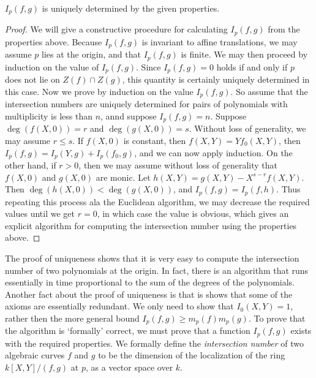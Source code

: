 \begin{theorem}
    $I_p(f,g)$ is uniquely determined by the given properties.
\end{theorem}
\begin{proof}
    We will give a constructive procedure for calculating $I_p(f,g)$ from the properties above. Because $I_p(f,g)$ is invariant to affine translations, we may assume $p$ lies at the origin, and that $I_p(f,g)$ is finite. We may then proceed by induction on the value of $I_p(f,g)$. Since $I_p(f,g) = 0$ holds if and only if $p$ does not lie on $Z(f) \cap Z(g)$, this quantity is certainly uniquely determined in this case. Now we prove by induction on the value $I_p(f,g)$. So assume that the intersection numbers are uniquely determined for pairs of polynomials with multiplicity is less than $n$, annd suppose $I_p(f,g) = n$. Suppose $\deg(f(X,0)) = r$ and $\deg(g(X,0)) = s$. Without loss of generality, we may assume $r \leq s$. If $f(X,0)$ is constant, then $f(X,Y) = Y f_0(X,Y)$, then $I_p(f,g) = I_p(Y,g) + I_p(f_0,g)$, and we can now apply induction. On the other hand, if $r > 0$, then we may assume without loss of generality that $f(X,0)$ and $g(X,0)$ are monic. Let $h(X,Y) = g(X,Y) - X^{s-r}f(X,Y)$. Then $\deg(h(X,0)) < \deg(g(X,0))$, and $I_p(f,g) = I_p(f,h)$. Thus repeating this process ala the Euclidean algorithm, we may decrease the required values until we get $r = 0$, in which case the value is obvious, which gives an explicit algorithm for computing the intersection number using the properties above.
\end{proof}

The proof of uniqueness shows that it is very easy to compute the intersection number of two polynomials at the origin. In fact, there is an algorithm that runs essentially in time proportional to the sum of the degrees of the polynomials. Another fact about the proof of uniqueness is that is shows that some of the axioms are essentially redundant. We only need to show that $I_0(X,Y) = 1$, rather then the more general bound $I_p(f,g) \geq m_p(f) m_p(g)$. To prove that the algorithm is `formally' correct, we must prove that a function $I_p(f,g)$ exists with the required properties. We formally define the \emph{intersection number} of two algebraic curves $f$ and $g$ to be the dimension of the localization of the ring $k[X,Y]/(f,g)$ at $p$, as a vector space over $k$.

